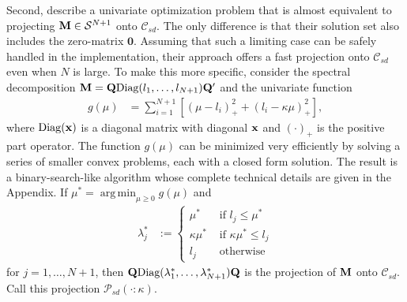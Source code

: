 \documentclass[11pt]{article}
\newcommand{\R}{\mathbb{R}}
\DeclareMathOperator*{\argmin}{arg\,min}
\theoremstyle{definition}
\theoremstyle{definition}
\def\x{{\bf x}}
\def\M{{\bf M}}
\def\Q{{\bf Q}}
\def\Diag{\text{Diag}}
\begin{document}
Second, \cite{tanaka2014positive} describe a univariate optimization problem that is almost equivalent to projecting $\M \in \mathcal{S}^{N+1}$ onto $\mathcal{C}_{sd}$. The only difference is that their solution set also includes the zero-matrix $\boldsymbol{0}$. Assuming that such a limiting case can be safely handled in the implementation, their approach offers a fast projection onto  $\mathcal{C}_{sd}$ even when $N$ is large. To make this more specific, consider the spectral decomposition $\M = \Q \Diag(l_1, \dots, l_{N+1}) \Q'$ and the univariate function 
\begin{align*}
g(\mu) &= \sum_{i=1}^{N+1} \left[ \left(\mu-l_i\right)^2_+ + \left(l_i - \kappa\mu\right)^2_+ \right],
\end{align*}
where $\Diag(\x)$ is a diagonal matrix with diagonal $\x$ and $(\cdot)_+$ is the positive part operator. The function $g(\mu)$ can be minimized very efficiently by solving a series of smaller convex problems, each with a closed form solution. The result is a binary-search-like algorithm whose complete technical details are given in the Appendix.
If $\mu^* = \argmin_{\mu \geq 0} g(\mu)$ and 
\begin{align*}
\lambda_j^* &:= \begin{cases}
\mu^* & \text{ if } l_j \leq \mu^*\\
\kappa \mu^* & \text{ if } \kappa \mu^*  \leq l_j\\
l_j & \text{ otherwise}
\end{cases}
\end{align*}
for $j = 1, \dots, N+1$,  then $\Q \Diag(\lambda_1^*, \dots, \lambda_{N+1}^*) \Q$ is the projection of $\M$ onto $\mathcal{C}_{sd}$. Call this projection $\mathcal{P}_{sd}(\cdot : \kappa)$. 
\end{document}
